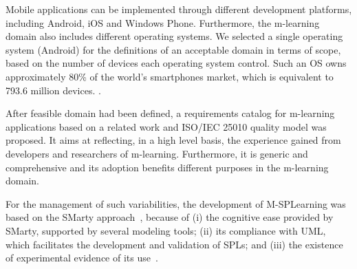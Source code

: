 Mobile applications can be implemented through different development platforms, including Android, iOS and Windows Phone. Furthermore, the m-learning domain also includes different operating systems. We selected a single operating system (Android) for the definitions of an acceptable domain in terms of scope, based on the number of devices each operating system control. Such an OS owns approximately 80\% of the world's smartphones market, which is equivalent to 793.6 million devices. \cite{llamas14}.

After feasible domain had been defined, a requirements catalog for m-learning applications based on a related work \cite{filho13} and ISO/IEC 25010 quality model was proposed. It aims at reflecting, in a high level basis, the experience gained from developers and researchers of m-learning. Furthermore, it is generic and comprehensive and its adoption benefits different purposes in the m-learning domain. 

For the management of such variabilities, the development of M-SPLearning was based on the SMarty approach~\cite{oliveirajr10}, because of (i) the cognitive ease provided by SMarty, supported by several modeling tools; (ii) its compliance with UML, which facilitates the development and validation of SPLs; and (iii) the existence of experimental evidence of its use~\cite{marcolino13,marcolino14a,marcolino14b,bera15}. 

